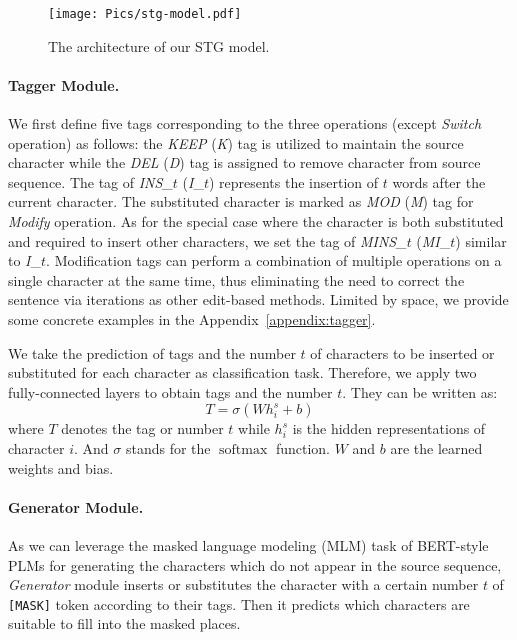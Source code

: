 \documentclass[11pt]{article}
\begin{document}
\begin{figure}[t]
	\centering
	\texttt{[image: Pics/stg-model.pdf]} 
	\caption{The architecture of our STG model.}
	\label{fig:stg-model}
\end{figure}
 
\paragraph{Tagger Module.} We first define five tags corresponding to the three operations (except \emph{Switch} operation) as follows: the \emph{KEEP} (\emph{K}) tag is utilized to maintain the source character while the \emph{DEL} (\emph{D}) tag is assigned to remove character from source sequence. The tag of \emph{INS\_$t$} (\emph{I}\_$t$) represents the insertion of $t$ words after the current character. The substituted character is marked as \emph{MOD} (\emph{M}) tag for \emph{Modify} operation. As for the special case where the character is both substituted and required to insert other characters, we set the tag of \emph{MINS\_$t$} (\emph{MI}\_$t$) similar to \emph{I}\_$t$. Modification tags can perform a combination of multiple operations on a single character at the same time, thus eliminating the need to correct the sentence via iterations as other edit-based methods. Limited by space, we provide some concrete examples in the Appendix~\ref{appendix:tagger}.

We take the prediction of tags and the number $t$ of characters to be inserted or substituted for each character as classification task. Therefore, we apply two fully-connected layers to obtain tags and the number $t$. They can be written as:
\begin{equation}
    T = \sigma \left( Wh_i^s + b \right) 
    \label{eq:3}
\end{equation}
where $T$ denotes the tag or number $t$ while $h_i^s$ is the hidden representations of character $i$. And $\sigma$ stands for the $\operatorname{softmax}$ function. $W$ and $b$ are the learned weights and bias.


\paragraph{Generator Module.} As we can leverage the masked language modeling (MLM) task \cite{devlin2018bert} of BERT-style PLMs for generating the characters which do not appear in the source sequence, \emph{Generator} module inserts or substitutes the character with a certain number $t$ of \texttt{[MASK]} token according to their tags. Then it predicts which characters are suitable to fill into the masked places.
\end{document}

